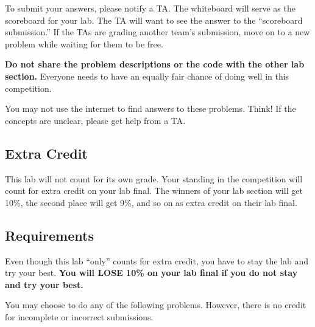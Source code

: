 \documentclass[11pt]{cselabheader}
\theoremstyle{plain}
\begin{document}

To submit your answers, please notify a TA. The whiteboard will serve as the
scoreboard for your lab. The TA will want to see the answer to the ``scoreboard
submission.'' If the TAs are grading another team's submission,  move on to a
new problem while waiting for them to be free.

\textbf{Do not share the problem descriptions or the code with the other lab
section.} Everyone needs to have an equally fair chance of doing well in this
competition.

You may not use the internet to find answers to these problems. Think! If the
concepts are unclear, please get help from a TA.

\subsection{Extra Credit}
This lab will not count for its own grade. Your standing in the competition 
will count for extra credit on your lab final.
The winners of your lab section will get 10\%, the second place will get
9\%, and so on as extra credit on their lab final. 


\subsection{Requirements}
Even though this lab ``only'' counts for extra credit, you have to stay the lab
and try your best. \textbf{You will LOSE 10\% on your lab final if you do not
stay and try your best.}

You may choose to do any of the following problems. However, there is no credit
for incomplete or incorrect submissions.

\end{document}
